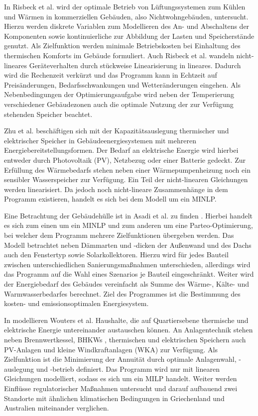In Risbeck et al. \cite{Risbeck.2017} wird der optimale Betrieb von Lüftungssystemen zum Kühlen und Wärmen in kommerziellen Gebäuden, also Nichtwohngebäuden, untersucht.
Hierzu werden diskrete Variablen zum Modellieren des An- und Abschaltens der Komponenten sowie kontinuierliche zur Abbildung der Lasten und Speicherstände genutzt.
Als Zielfunktion werden minimale Betriebskosten bei Einhaltung des thermischen Komforts im Gebäude formuliert.
Auch Risbeck et al. wandeln nicht-lineares Geräteverhalten durch stückweise Linearisierung in lineares.
Dadurch wird die Rechenzeit verkürzt und das Programm kann in Echtzeit auf Preisänderungen, Bedarfsschwankungen und Wetteränderungen eingehen.
Als Nebenbedingungen der Optimierungsaufgabe wird neben der Temperierung verschiedener Gebäudezonen auch die optimale Nutzung der zur Verfügung stehenden Speicher beachtet.

Zhu et al. \cite{Zhu.2019} beschäftigen sich mit der Kapazitätsauslegung thermischer und elektrischer Speicher in Gebäudeenergiesystemen mit mehreren Energiebereitstellungsformen. 
Der Bedarf an elektrische Energie wird hierbei entweder durch Photovoltaik (PV), Netzbezug oder einer Batterie gedeckt. 
Zur Erfüllung des Wärmebedarfs stehen neben einer Wärmepumpenheizung noch ein sensibler Wasserspeicher zur Verfügung.
Ein Teil der nicht-linearen Gleichungen werden linearisiert. Da jedoch noch nicht-lineare Zusammenhänge in dem Programm existieren, handelt es sich bei dem Modell um ein MINLP.

Eine Betrachtung der Gebäudehülle ist in Asadi et al. zu finden \cite{Asadi.2012}.
Hierbei handelt es sich zum einen um ein MINLP und zum anderen um eine Parteo-Optimierung, bei welcher dem Programm mehrere Zielfunktionen übergeben werden.
Das Modell betrachtet neben Dämmarten und -dicken der Außenwand und des Dachs auch den Fenstertyp sowie Solarkollektoren. 
Hierzu wird für jedes Bauteil zwischen unterschiedlichen Sanierungsmaßnahmen unterschieden, allerdings wird das Programm auf die Wahl eines Szenarios je Bauteil eingeschränkt.
Weiter wird der Energiebedarf des Gebäudes vereinfacht als Summe des Wärme-, Kälte- und Warmwasserbedarfes berechnet.
Ziel des Programmes ist die Bestimmung des kosten- und emissionsoptimalen Energiesystem.

In \cite{Wouters.2014} modellieren Wouters et al. Haushalte, die auf Quartiersebene thermische und elektrische Energie untereinander austauschen können.
An Anlagentechnik stehen neben Brennwertkessel, BHKWs , thermischen und elektrischen Speichern auch PV-Anlagen und kleine Windkraftanlagen (WKA) zur Verfügung.
Als Zielfunktion ist die Minimierung der Annuität durch optimale Anlagenwahl, -auslegung und -betrieb definiert.
Das Programm wird nur mit linearen Gleichungen modelliert, sodass es sich um ein MILP handelt.
Weiter werden Einflüsse regulatorischer Maßnahmen untersucht und darauf aufbauend zwei Standorte mit ähnlichen klimatischen Bedingungen in Griechenland und Australien miteinander verglichen.

